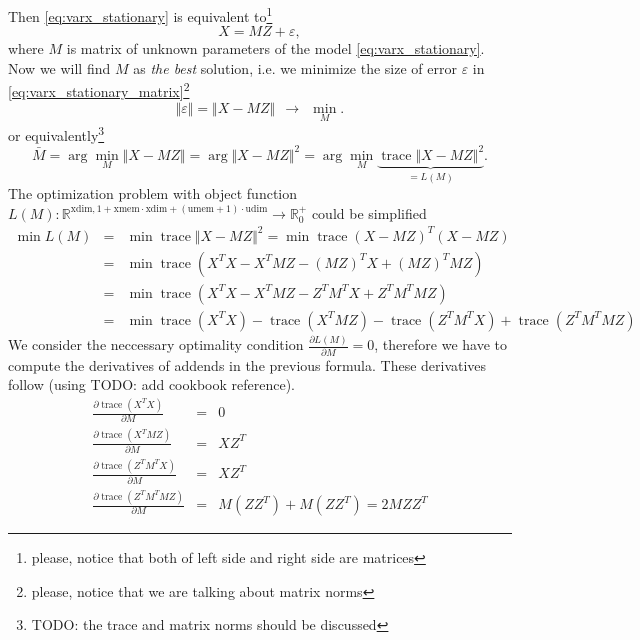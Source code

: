 \documentclass{article}
\DeclareMathOperator{\tr}{\mathrm{trace} }
\newcommand{\todo}[1]{{\color{red}TODO: #1}} %
\begin{document}
 Then \eqref{eq:varx_stationary} is equivalent to\footnote{please, notice that both of left side and right side are matrices}
 \begin{equation}
  \label{eq:varx_stationary_matrix}
  X = MZ + \varepsilon,
 \end{equation}
 where $M$ is matrix of unknown parameters of the model \eqref{eq:varx_stationary}.
 Now we will find $M$ as \emph{the best} solution, i.e. we minimize the size of error $\varepsilon$ in \eqref{eq:varx_stationary_matrix}\footnote{please, notice that we are talking about matrix norms}
 \begin{displaymath}
  \label{eq:eq:varx_stationary_matrix_eps}
  \Vert \varepsilon \Vert = \Vert X - MZ \Vert ~~ \rightarrow ~~ \min\limits_{M}.
 \end{displaymath}
 or equivalently\footnote{\todo{the trace and matrix norms should be discussed}}
 \begin{displaymath}
   \bar{M} =  \arg \min\limits_{M} \Vert X - MZ \Vert =  \arg \Vert X - MZ \Vert^2 =  \arg \min\limits_{M} \underbrace{\tr\Vert X - MZ \Vert^2}_{= L(M)}.
 \end{displaymath}
 The optimization problem with object function $L(M): \mathbb{R}^{\mathrm{xdim},1+\mathrm{xmem}\cdot\mathrm{xdim}+(\mathrm{umem}+1)\cdot\mathrm{udim}} \rightarrow \mathbb{R}^{+}_0$ could be simplified 
 \begin{displaymath}
  \begin{array}{rcl}
   \min L(M) & = & \min \tr \Vert X - MZ \Vert^2 = \min \tr (X-MZ)^T(X-MZ) \\
        & = & \min \tr \left( X^TX - X^TMZ - (MZ)^TX + (MZ)^T MZ \right) \\
        & = & \min \tr \left( X^TX - X^TMZ - Z^TM^TX + Z^T M^T MZ \right) \\
        & = & \min \tr (X^TX) - \tr (X^TMZ) - \tr (Z^TM^TX) + \tr (Z^T M^T MZ)
  \end{array}
 \end{displaymath}
 We consider the neccessary optimality condition $\frac{\partial L(M)}{\partial M} = 0$, therefore we have to compute the derivatives of addends in the previous formula.
 These derivatives follow (using \cite{matrix_cookbook}\todo{add cookbook reference}).
 \begin{displaymath}
  \begin{array}{rcl}
   \frac{\partial \tr (X^TX)}{\partial M} & = & 0 \\
   \frac{\partial \tr (X^TMZ)}{\partial M} & = & XZ^T \\
   \frac{\partial \tr (Z^TM^TX)}{\partial M} & = & XZ^T \\
   \frac{\partial \tr (Z^TM^T M Z)}{\partial M} & = & M(ZZ^T) + M (ZZ^T) = 2MZZ^T
  \end{array}
 \end{displaymath}
\end{document}
